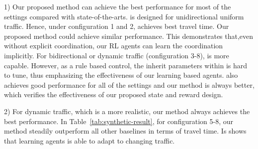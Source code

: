 1) Our proposed method \PressLight can achieve the best performance for most of the settings compared with state-of-the-arts. \Greenwave is designed for unidirectional uniform traffic. Hence, under configuration 1 and 2, \Greenwave achieves best travel time. Our proposed method could achieve similar performance. This demonstrates that,even without explicit coordination, our RL agents can learn the coordination implicitly. For bidirectional or dynamic traffic (configuration 3-8), \Maxpressure is more capable. However, as a rule based control, the inherit parameters within \Maxpressure is hard to tune, thus emphasizing the effectiveness of our learning based agents. \Deeplight also achieves good performance for all of the settings and our method is always better, which verifies the effectiveness of our proposed state and reward design.



2) For dynamic traffic, which is a more realistic, our method always achieves the best performance. In Table~\ref{tab:synthetic-result}, for configuration 5-8, our method steadily outperform all other baselines in terms of travel time. Is shows that learning agents is able to adapt to changing traffic. 

